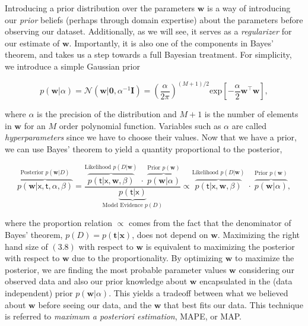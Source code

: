 \documentclass[
  0.875em,
  letterpaper,
  DIV=11,
  numbers=noendperiod]{scrartcl}
\begin{document}
Introducing a prior distribution over the parameters \(\mathbf{w}\) is a
way of introducing our \emph{prior} beliefs (perhaps through domain
expertise) about the parameters before observing our dataset.
Additionally, as we will see, it serves as a \emph{regularizer} for our
estimate of \(\mathbf{w}\). Importantly, it is also one of the
components in Bayes' theorem, and takes us a step towards a full
Bayesian treatment. For simplicity, we introduce a simple Gaussian prior

\[
p(\mathbf{w}| \alpha) = \mathcal{N}(\mathbf{w} | \mathbf{0}, \alpha^{-1} \mathbf{I}) = \left( \frac{\alpha}{2 \pi} \right)^{(M+1) / 2} \text{exp} \left[- \frac{\alpha}{2} \mathbf{w}^{\intercal} \mathbf{w} \right], \tag{3.7} 
\]

where \(\alpha\) is the precision of the distribution and \(M+1\) is the
number of elements in \(\mathbf{w}\) for an \(M\) order polynomial
function. Variables such as \(\alpha\) are called \emph{hyperparameters}
since we have to choose their values. Now that we have a prior, we can
use Bayes' theorem to yield a quantity proportional to the posterior,

\[
\overbrace{ p(\mathbf{w}|\pmb{\mathsf{x}}, \pmb{\mathsf{t}}, \alpha, \beta) }^{\text{Posterior } p(\mathbf{w}|D)} = \frac{\overbrace{p(\pmb{\mathsf{t}}|\pmb{\mathsf{x}}, \mathbf{w}, \beta)}^{\text{Likelihood } p(D|\mathbf{w})} \; \cdot \; \overbrace{p(\mathbf{w}|\alpha)}^{\text{Prior }p(\mathbf{w})}}{\underbrace{p(\pmb{\mathsf{t}}|\pmb{\mathsf{x}})}_{\text{Model Evidence } p(D)}} \propto \overbrace{p(\pmb{\mathsf{t}}|\pmb{\mathsf{x}}, \mathbf{w}, \beta)}^{\text{Likelihood } p(D|\mathbf{w})} \; \cdot \; \overbrace{p(\mathbf{w}|\alpha)}^{\text{Prior }p(\mathbf{w})}, \tag{3.8}
\]

where the proportion relation \(\propto\) comes from the fact that the
denominator of Bayes' theorem, \(p(D) = p(\mathbf{t} | \mathbf{x})\),
does not depend on \(\mathbf{w}\). Maximizing the right hand size of
\((3.8)\) with respect to \(\mathbf{w}\) is equivalent to maximizing the
posterior with respect to \(\mathbf{w}\) due to the proportionality. By
optimizing \(\mathbf{w}\) to maximize the posterior, we are finding the
most probable parameter values \(\mathbf{w}\) considering our observed
data and also our prior knowledge about \(\mathbf{w}\) encapsulated in
the (data independent) prior \(p(\mathbf{w} | \alpha)\). This yields a
tradeoff between what we believed about \(\mathbf{w}\) before seeing our
data, and the \(\mathbf{w}\) that best fits our data. This technique is
referred to \emph{maximum a posteriori estimation}, MAPE, or MAP.
\end{document}
